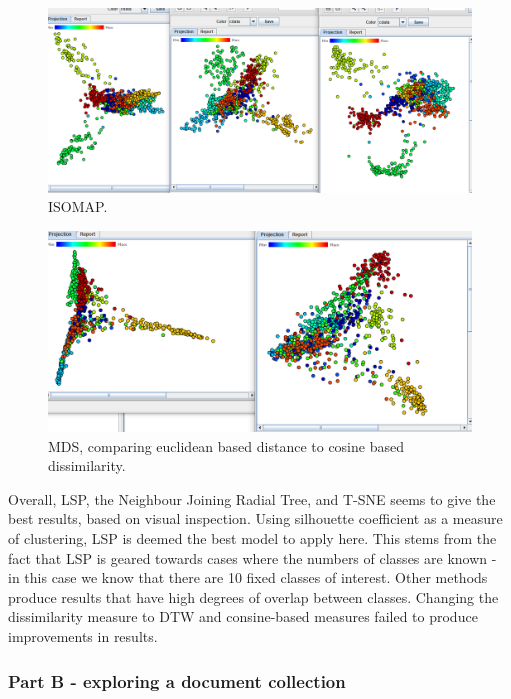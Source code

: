 \documentclass[ 10pt ]{fphw}
\begin{document}
\begin{center}
\begin{figure}[H]
    \centering
	\includegraphics[width=0.95\columnwidth]{isomap.PNG} 
	\caption{ISOMAP.}
	\label{fig:isomap}
	\end{figure}
\end{center}

\begin{center}
\begin{figure}[H]
    \centering
	\includegraphics[width=0.95\columnwidth]{mdsEucVSCos.PNG} 
	\caption{MDS, comparing euclidean based distance to cosine based dissimilarity.}
	\label{fig:mdsEuc}
	\end{figure}
\end{center}


Overall, LSP, the Neighbour Joining Radial Tree, and T-SNE seems to give the best results, based on visual inspection. Using silhouette coefficient as a measure of clustering, LSP is deemed the best model to apply here. This stems from the fact that LSP is geared towards cases where the numbers of classes are known - in this case we know that there are 10 fixed classes of interest. Other methods produce results that have high degrees of overlap between classes. Changing the dissimilarity measure to DTW and consine-based measures failed to produce improvements in results.

\subsubsection*{Part B - exploring a document collection}
\end{document}
